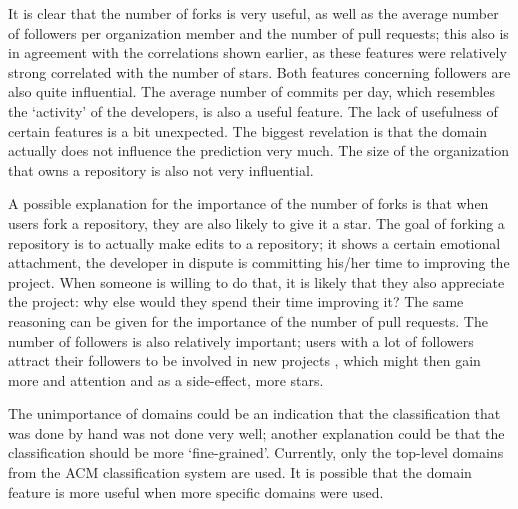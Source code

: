      It is clear that the number of forks is very useful, as well as the average number of followers per organization member and the number of pull requests; this also is in agreement with the correlations shown earlier, as these features were relatively strong correlated with the number of stars. Both features concerning followers are also quite influential. 
     The average number of commits per day, which resembles the `activity' of the developers, is also a useful feature.
     The lack of usefulness of certain features is a bit unexpected. The biggest revelation is that the domain actually does not influence the prediction very much. The size of the organization that owns a repository is also not very influential.
     
     A possible explanation for the importance of the number of forks is that when users fork a repository, they are also likely to give it a star. 
     The goal of forking a repository is to actually make edits to a repository; it shows a certain emotional attachment, the developer in dispute is committing his/her time to improving the project. 
     When someone is willing to do that, it is likely that they also appreciate the project: why else would they spend their time improving it? The same reasoning can be given for the importance of the number of pull requests.
     The number of followers is also relatively important; users with a lot of followers attract their followers to be involved in new projects \cite{blincoe-2015}, which might then gain more and attention and as a side-effect, more stars.
     
     The unimportance of domains could be an indication that the classification that was done by hand was not done very well; another explanation could be that the classification should be more `fine-grained'. 
     Currently, only the top-level domains from the ACM classification system are used. It is possible that the domain feature is more useful when more specific domains were used.

